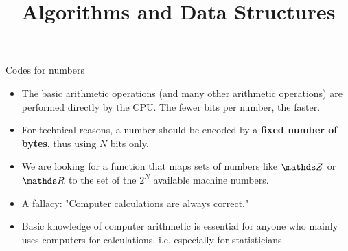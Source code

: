 \documentclass[11pt,compress,t,notes=noshow, xcolor=table]{beamer}
\title{Algorithms and Data Structures}
\begin{document}



\begin{vbframe}{Codes for numbers}
\begin{itemize}


\item The basic arithmetic operations (and many other arithmetic operations)
  are performed directly by the CPU. The fewer bits per number,
  the faster.
\item For technical reasons, a number should be encoded by a
  \textbf{fixed number of bytes}, thus using $N$ bits only.
\item We are looking for a function that maps sets of numbers like $\Z$ or $\R$
   to the set of the $2^N$ available machine numbers.
\item A fallacy: "Computer calculations are always correct."
\item Basic knowledge of computer arithmetic is essential for anyone who mainly uses computers for calculations, i.e. especially for statisticians.
\end{itemize}

\framebreak


\end{vbframe}
\end{document}
